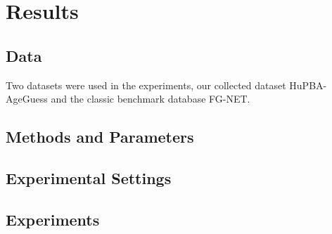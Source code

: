 \chapter{Results} \label{chap:experiments}

\section{Data}
Two datasets were used in the experiments, our collected dataset HuPBA-AgeGuess and the classic benchmark database FG-NET.

\section{Methods and Parameters}
\section{Experimental Settings}

\section{Experiments}